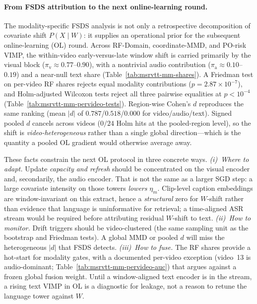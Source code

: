 
\paragraph{From FSDS attribution to the next online-learning round.}
The modality-specific FSDS analysis is not only a retrospective decomposition of covariate shift $P(X\mid W)$: it supplies an operational prior for the subsequent online-learning (OL) round.
Across RF-Domain, coordinate-MMD, and PO-risk VIMP, the within-video early-versus-late window shift is carried primarily by the visual block ($\pi_{\mathrm{v}}\approx 0.77$--$0.90$), with a nontrivial audio contribution ($\pi_{\mathrm{a}}\approx 0.10$--$0.19$) and a near-null text share (Table~\ref{tab:msrvtt-mm-shares}).
A Friedman test on per-video RF shares rejects equal modality contributions ($p=2.87\times 10^{-7}$), and Holm-adjusted Wilcoxon tests reject all three pairwise equalities at $p<10^{-4}$ (Table~\ref{tab:msrvtt-mm-pervideo-tests}).
Region-wise Cohen's $d$ reproduces the same ranking (mean $|d|$ of $0.787$/$0.518$/$0.000$ for video/audio/text).
Signed pooled $d$ cancels across videos ($0/24$ Holm hits at the pooled-region level), so the shift is \emph{video-heterogeneous} rather than a single global direction---which is the quantity a pooled OL gradient would otherwise average away.

These facts constrain the next OL protocol in three concrete ways.
\emph{(i)~Where to adapt.}
Update \emph{capacity and refresh} should be concentrated on the visual encoder and, secondarily, the audio encoder.
That is not the same as a larger SGD step: a large covariate intensity on those towers \emph{lowers} $\eta_m$.
Clip-level caption embeddings are window-invariant on this extract, hence a \emph{structural} zero for $W$-shift rather than evidence that language is uninformative for retrieval; a time-aligned ASR stream would be required before attributing residual $W$-shift to text.
\emph{(ii)~How to monitor.}
Drift triggers should be video-clustered (the same sampling unit as the bootstrap and Friedman tests).
A global MMD or pooled $d$ will miss the heterogeneous $|d|$ that FSDS detects.
\emph{(iii)~How to fuse.}
The RF shares provide a hot-start for modality gates, with a documented per-video exception (video~13 is audio-dominant; Table~\ref{tab:msrvtt-mm-pervideo-auc}) that argues against a frozen global fusion weight.
Until a window-aligned text encoder is in the stream, a rising text VIMP in OL is a diagnostic for leakage, not a reason to retune the language tower against $W$.

